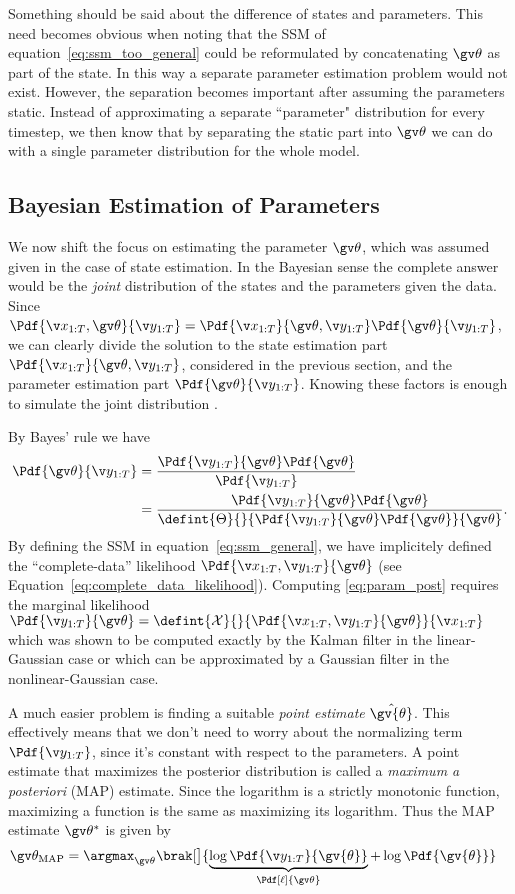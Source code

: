 

Something should be said about the difference
of states and parameters.
This need becomes obvious when noting that the SSM of equation~\eqref{eq:ssm_too_general}
could be reformulated by concatenating $\Th$ as part of the state. In this
way a separate parameter estimation problem would not exist. However, the 
separation becomes important after assuming the parameters static. Instead of 
approximating a separate ``parameter" distribution for every
timestep, we then know that by separating the static part into
$\Th$ we can do with a single parameter distribution for the whole model. 


\subsection{Bayesian Estimation of Parameters}%
We now shift the focus on estimating the parameter $\Th$, which was assumed
given in the case of state estimation. In the Bayesian sense the complete 
answer would be the \emph{joint} distribution of the states and the parameters given the data. 
Since $\Pdf{\X,\Th}{\Y}=\Pdf{\X}{\Th,\Y}\Pdf{\Th}{\Y}$, we can clearly 
divide the solution to the state estimation part $\Pdf{\X}{\Th,\Y}$,
considered in the previous section, 
and the parameter estimation part $\Pdf{\Th}{\Y}$. Knowing these
factors is enough to simulate the joint distribution \parencite{gelman2004}. 

By Bayes' rule we have
\begin{align}
	\Pdf{\Th}{\Y}&=\frac{\Pdf{\Y}{\Th}\Pdf{\Th}}{\Pdf{\Y}}\\
	&=\frac{\Pdf{\Y}{\Th}\Pdf{\Th}}{\defint{\Theta}{}{\Pdf{\Y}{\Th}\Pdf{\Th}}{\Th}}.
	\label{eq:param_post}
\end{align}
By defining the SSM in equation~\eqref{eq:ssm_general}, we have
implicitely defined the ``complete-data'' likelihood $\Pdf{\X,\Y}{\Th}$
(see Equation~\eqref{eq:complete_data_likelihood}).
Computing \eqref{eq:param_post} requires the marginal likelihood
$\Pdf{\Y}{\Th}=\defint{\mathcal{X}}{}{\Pdf{\X,\Y}{\Th}}{\X}$ which
was shown to be computed exactly by the Kalman filter in the linear-Gaussian case
or which can be approximated by a Gaussian filter in the nonlinear-Gaussian case.



A much easier problem is finding a suitable \emph{point estimate} $\hat{\gv{\theta}}$.
This effectively means that we don't need to worry about the normalizing
term $\Pdf{\Y}$, since it's constant with respect to the parameters. 
A point estimate that maximizes the posterior distribution
is called a \emph{maximum a posteriori} (MAP) estimate. 
Since the logarithm is a strictly monotonic function, maximizing a function
is the same as maximizing its logarithm. Thus the MAP estimate $\Th^*$ is given by 
\begin{align}
	\Th_{\text{MAP}} &= \argmax_{\Th}\brak[\big]{\underbrace{\log \Pdf{\Y}{\gv{\theta}}}_{\Pdf[\ell]{\Th}} + \log\Pdf{\gv{\theta}}}
	\label{eq:MAP}
\end{align}

